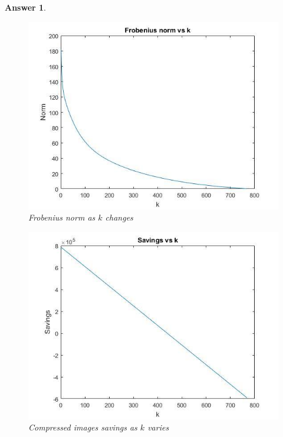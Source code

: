 \documentclass[12pt]{article}
\theoremstyle{colon}
\newtheorem*{answer}{Answer}
\begin{document}
\begin{answer}
\begin{enumerate}[label=\arabic*)]
      \begin{figure}[ht]
        \caption{Frobenius norm as $k$ changes}
        \centering
          \includegraphics[width=\textwidth]{norm.jpg}
      \end{figure}

      \begin{figure}[ht]
        \caption{Compressed images savings as $k$ varies}
        \centering
          \includegraphics[width=\textwidth]{savings.jpg}
      \end{figure}

    \clearpage


\end{enumerate}
\end{answer}
\end{document}
